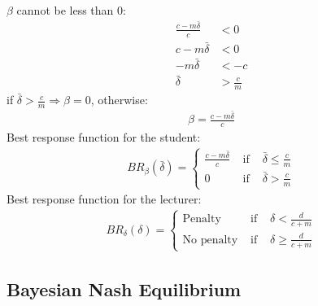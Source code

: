 \documentclass[11pt,preprint, authoryear]{elsarticle}
\numberwithin{equation}{section}
\numberwithin{figure}{section}
\numberwithin{table}{section}
\begin{document}
\(\beta\) cannot be less than 0: \begin{align*}
\frac{c-m \bar{\delta}}{c}&<0 \\
c-m \bar{\delta}&<0 \\
-m \bar{\delta}&< -c \\
\bar{\delta}&>\frac{c}{m}
\end{align*} if \(\bar{\delta}>\frac{c}{m} \Rightarrow \beta=0\),
otherwise: \begin{align*}
\beta =\frac{c-m \bar{\delta}}{c}
\end{align*} Best response function for the student: \begin{align*}
B R_{\beta}(\bar{\delta})=\left\{\begin{array}{lll}
\frac{c-m\bar{\delta}}{c} & \text { if } & \bar{\delta}\leq \frac{c}{m} \\
0 & \text { if } & \bar{\delta}> \frac{c}{m}
\end{array}\right.
\end{align*} Best response function for the lecturer: \begin{align*}
B R_{\delta}(\delta)=\left\{\begin{array}{lll}
\text{Penalty} & \text { if } & \delta<\frac{d}{c+m} \\
\text{No penalty} & \text { if } & \delta \geq \frac{d}{c+m}
\end{array}\right.
\end{align*}

\hypertarget{bayesian-nash-equilibrium}{%
\subsection*{\texorpdfstring{Bayesian Nash Equilibrium
\label{bay}}{Bayesian Nash Equilibrium }}\label{bayesian-nash-equilibrium}}
\end{document}
